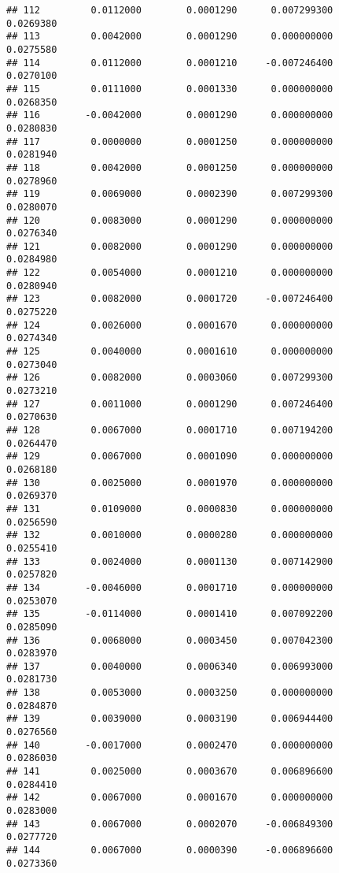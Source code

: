 \documentclass[
]{article}
\begin{document}
\begin{verbatim}
## 112         0.0112000        0.0001290      0.007299300             0.0269380
## 113         0.0042000        0.0001290      0.000000000             0.0275580
## 114         0.0112000        0.0001210     -0.007246400             0.0270100
## 115         0.0111000        0.0001330      0.000000000             0.0268350
## 116        -0.0042000        0.0001290      0.000000000             0.0280830
## 117         0.0000000        0.0001250      0.000000000             0.0281940
## 118         0.0042000        0.0001250      0.000000000             0.0278960
## 119         0.0069000        0.0002390      0.007299300             0.0280070
## 120         0.0083000        0.0001290      0.000000000             0.0276340
## 121         0.0082000        0.0001290      0.000000000             0.0284980
## 122         0.0054000        0.0001210      0.000000000             0.0280940
## 123         0.0082000        0.0001720     -0.007246400             0.0275220
## 124         0.0026000        0.0001670      0.000000000             0.0274340
## 125         0.0040000        0.0001610      0.000000000             0.0273040
## 126         0.0082000        0.0003060      0.007299300             0.0273210
## 127         0.0011000        0.0001290      0.007246400             0.0270630
## 128         0.0067000        0.0001710      0.007194200             0.0264470
## 129         0.0067000        0.0001090      0.000000000             0.0268180
## 130         0.0025000        0.0001970      0.000000000             0.0269370
## 131         0.0109000        0.0000830      0.000000000             0.0256590
## 132         0.0010000        0.0000280      0.000000000             0.0255410
## 133         0.0024000        0.0001130      0.007142900             0.0257820
## 134        -0.0046000        0.0001710      0.000000000             0.0253070
## 135        -0.0114000        0.0001410      0.007092200             0.0285090
## 136         0.0068000        0.0003450      0.007042300             0.0283970
## 137         0.0040000        0.0006340      0.006993000             0.0281730
## 138         0.0053000        0.0003250      0.000000000             0.0284870
## 139         0.0039000        0.0003190      0.006944400             0.0276560
## 140        -0.0017000        0.0002470      0.000000000             0.0286030
## 141         0.0025000        0.0003670      0.006896600             0.0284410
## 142         0.0067000        0.0001670      0.000000000             0.0283000
## 143         0.0067000        0.0002070     -0.006849300             0.0277720
## 144         0.0067000        0.0000390     -0.006896600             0.0273360

\end{verbatim}
\end{document}
